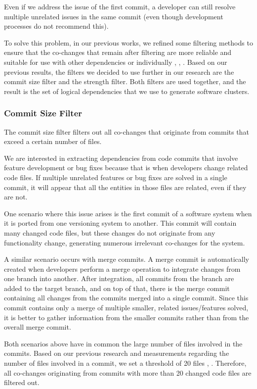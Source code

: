 Even if we address the issue of the first commit, a developer can still resolve multiple unrelated issues in the same commit (even though development processes do not recommend this).

To solve this problem, in our previous works, we refined some filtering methods to ensure that the co-changes that remain after filtering are more reliable and suitable for use with other dependencies or individually \cite{b4}, \cite{DepSACI}, \cite{enase19}. Based on our previous results, the filters we decided to use further in our research are the commit size filter and the strength filter. Both filters are used together, and the result is the set of logical dependencies that we use to generate software clusters.

\subsubsection{Commit Size Filter}

The commit size filter filters out all co-changes that originate from commits that exceed a certain number of files.

We are interested in extracting dependencies from code commits that involve feature development or bug fixes because that is when developers change related code files. If multiple unrelated features or bug fixes are solved in a single commit, it will appear that all the entities in those files are related, even if they are not.

One scenario where this issue arises is the first commit of a software system when it is ported from one versioning system to another. This commit will contain many changed code files, but these changes do not originate from any functionality change, generating numerous irrelevant co-changes for the system.

A similar scenario occurs with merge commits. A merge commit is automatically created when developers perform a merge operation to integrate changes from one branch into another. After integration, all commits from the branch are added to the target branch, and on top of that, there is the merge commit containing all changes from the commits merged into a single commit. Since this commit contains only a merge of multiple smaller, related issues/features solved, it is better to gather information from the smaller commits rather than from the overall merge commit.

Both scenarios above have in common the large number of files involved in the commits. Based on our previous research and measurements regarding the number of files involved in a commit, we set a threshold of 20 files \cite{b4}, \cite{b5}. Therefore, all co-changes originating from commits with more than 20 changed code files are filtered out.



